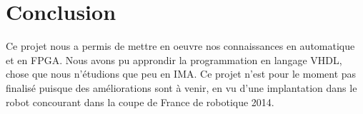 

\section{Conclusion}
Ce projet nous a permis de mettre en oeuvre nos connaissances en automatique et en FPGA. Nous avons pu approndir la programmation en langage VHDL, chose que
nous n'étudions que peu en IMA.  
Ce projet n'est pour le moment pas finalisé puisque des améliorations sont à venir, en vu d'une implantation dans le robot concourant dans la coupe de France de robotique
2014. 